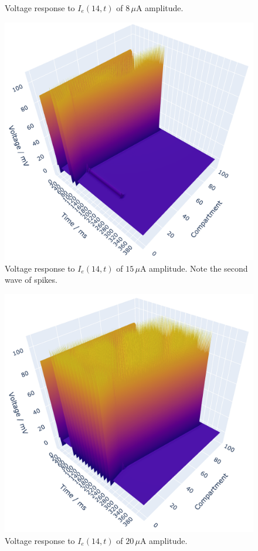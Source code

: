 \documentclass[12pt]{article}
\begin{document}
\begin{enumerate}
\begin{figure}[h]
        \caption{Voltage response to $I_{e}(14,t)$ of $8 \, \mu \text{A}$ amplitude.}
    \end{figure}
    \begin{figure}[h]
        \centering
        \includegraphics[width=1\textwidth]{15A.png}
        \caption{Voltage response to $I_{e}(14,t)$ of $15 \, \mu \text{A}$ amplitude. Note the 
        second wave of spikes.}
    \end{figure}
    \begin{figure}[h]
        \centering
        \includegraphics[width=1\textwidth]{20A.png}
        \caption{Voltage response to $I_{e}(14,t)$ of $20 \, \mu \text{A}$ amplitude.}
    \end{figure}
\end{enumerate}
\end{document}
